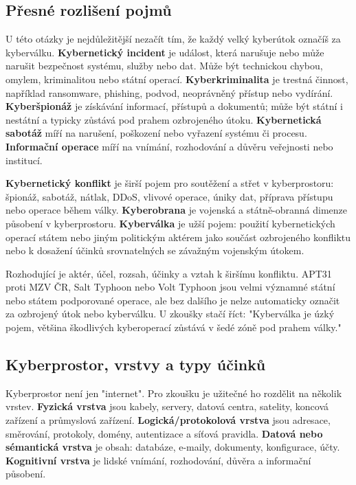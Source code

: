 \subsection*{Přesné rozlišení pojmů}
U této otázky je nejdůležitější nezačít tím, že každý velký kyberútok označíš za kyberválku. \textbf{Kybernetický incident} je událost, která narušuje nebo může narušit bezpečnost systému, služby nebo dat. Může být technickou chybou, omylem, kriminalitou nebo státní operací. \textbf{Kyberkriminalita} je trestná činnost, například ransomware, phishing, podvod, neoprávněný přístup nebo vydírání. \textbf{Kyberšpionáž} je získávání informací, přístupů a dokumentů; může být státní i nestátní a typicky zůstává pod prahem ozbrojeného útoku. \textbf{Kybernetická sabotáž} míří na narušení, poškození nebo vyřazení systému či procesu. \textbf{Informační operace} míří na vnímání, rozhodování a důvěru veřejnosti nebo institucí.

\textbf{Kybernetický konflikt} je širší pojem pro soutěžení a střet v kyberprostoru: špionáž, sabotáž, nátlak, DDoS, vlivové operace, úniky dat, příprava přístupu nebo operace během války. \textbf{Kyberobrana} je vojenská a státně-obranná dimenze působení v kyberprostoru. \textbf{Kyberválka} je užší pojem: použití kybernetických operací státem nebo jiným politickým aktérem jako součást ozbrojeného konfliktu nebo k dosažení účinků srovnatelných se závažným vojenským útokem.

Rozhodující je aktér, účel, rozsah, účinky a vztah k širšímu konfliktu. APT31 proti MZV ČR, Salt Typhoon nebo Volt Typhoon jsou velmi významné státní nebo státem podporované operace, ale bez dalšího je nelze automaticky označit za ozbrojený útok nebo kyberválku. U zkoušky stačí říct: "Kyberválka je úzký pojem, většina škodlivých kyberoperací zůstává v šedé zóně pod prahem války."

\subsection*{Kyberprostor, vrstvy a typy účinků}
Kyberprostor není jen "internet". Pro zkoušku je užitečné ho rozdělit na několik vrstev. \textbf{Fyzická vrstva} jsou kabely, servery, datová centra, satelity, koncová zařízení a průmyslová zařízení. \textbf{Logická/protokolová vrstva} jsou adresace, směrování, protokoly, domény, autentizace a síťová pravidla. \textbf{Datová nebo sémantická vrstva} je obsah: databáze, e-maily, dokumenty, konfigurace, účty. \textbf{Kognitivní vrstva} je lidské vnímání, rozhodování, důvěra a informační působení.

